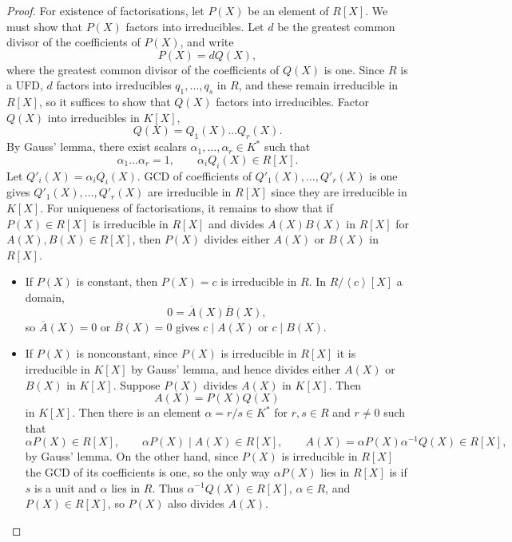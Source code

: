 \documentclass{article}
\newcommand{\rb}[1]{\left( #1 \right)}
\renewcommand{\sb}[1]{\left[ #1 \right]}
\newcommand{\ab}[1]{\left\langle #1 \right\rangle}
\theoremstyle{definition}\newtheorem{definition}{Definition}[subsection]
\theoremstyle{definition}\newtheorem{remark}[definition]{Remark}
\theoremstyle{definition}\newtheorem*{example}{Example}
\theoremstyle{definition}\newtheorem*{note}{Note}
\begin{document}
\begin{proof}
For existence of factorisations, let $ P\rb{X} $ be an element of $ R\sb{X} $. We must show that $ P\rb{X} $ factors into irreducibles. Let $ d $ be the greatest common divisor of the coefficients of $ P\rb{X} $, and write
$$ P\rb{X} = dQ\rb{X}, $$
where the greatest common divisor of the coefficients of $ Q\rb{X} $ is one. Since $ R $ is a UFD, $ d $ factors into irreducibles $ q_1, \dots, q_s $ in $ R $, and these remain irreducible in $ R\sb{X} $, so it suffices to show that $ Q\rb{X} $ factors into irreducibles. Factor $ Q\rb{X} $ into irreducibles in $ K\sb{X} $,
$$ Q\rb{X} = Q_1\rb{X} \dots Q_r\rb{X}. $$
By Gauss' lemma, there exist scalars $ \alpha_1, \dots, \alpha_r \in K^* $ such that
$$ \alpha_1 \dots \alpha_r = 1, \qquad \alpha_iQ_i\rb{X} \in R\sb{X}. $$
Let $ Q'_i \rb{X} = \alpha_iQ_i\rb{X} $. GCD of coefficients of $ Q'_1\rb{X}, \dots, Q'_r\rb{X} $ is one gives $ Q'_1\rb{X}, \dots, Q'_r\rb{X} $ are irreducible in $ R\sb{X} $ since they are irreducible in $ K\sb{X} $. For uniqueness of factorisations, it remains to show that if $ P\rb{X} \in R\sb{X} $ is irreducible in $ R\sb{X} $ and divides $ A\rb{X}B\rb{X} $ in $ R\sb{X} $ for $ A\rb{X}, B\rb{X} \in R\sb{X} $, then $ P\rb{X} $ divides either $ A\rb{X} $ or $ B\rb{X} $ in $ R\sb{X} $.
\begin{itemize}
\item If $ P\rb{X} $ is constant, then $ P\rb{X} = c $ is irreducible in $ R $. In $ R / \ab{c}\sb{X} $ a domain,
$$ 0 = \overline{A}\rb{X}\overline{B}\rb{X}, $$
so $ \overline{A}\rb{X} = 0 $ or $ \overline{B}\rb{X} = 0 $ gives $ c \mid A\rb{X} $ or $ c \mid B\rb{X} $.
\item If $ P\rb{X} $ is nonconstant, since $ P\rb{X} $ is irreducible in $ R\sb{X} $ it is irreducible in $ K\sb{X} $ by Gauss' lemma, and hence divides either $ A\rb{X} $ or $ B\rb{X} $ in $ K\sb{X} $. Suppose $ P\rb{X} $ divides $ A\rb{X} $ in $ K\sb{X} $. Then
$$ A\rb{X} = P\rb{X}Q\rb{X} $$
in $ K\sb{X} $. Then there is an element $ \alpha = r / s \in K^* $ for $ r, s \in R $ and $ r \ne 0 $ such that
$$ \alpha P\rb{X} \in R\sb{X}, \qquad \alpha P\rb{X} \mid A\rb{X} \in R\sb{X}, \qquad A\rb{X} = \alpha P\rb{X}\alpha^{-1} Q\rb{X} \in R\sb{X}, $$
by Gauss' lemma. On the other hand, since $ P\rb{X} $ is irreducible in $ R\sb{X} $ the GCD of its coefficients is one, so the only way $ \alpha P\rb{X} $ lies in $ R\sb{X} $ is if $ s $ is a unit and $ \alpha $ lies in $ R $. Thus $ \alpha^{-1}Q\rb{X} \in R\sb{X} $, $ \alpha \in R $, and $ P\rb{X} \in R\sb{X} $, so $ P\rb{X} $ also divides $ A\rb{X} $.
\end{itemize}
\end{proof}
\end{document}
